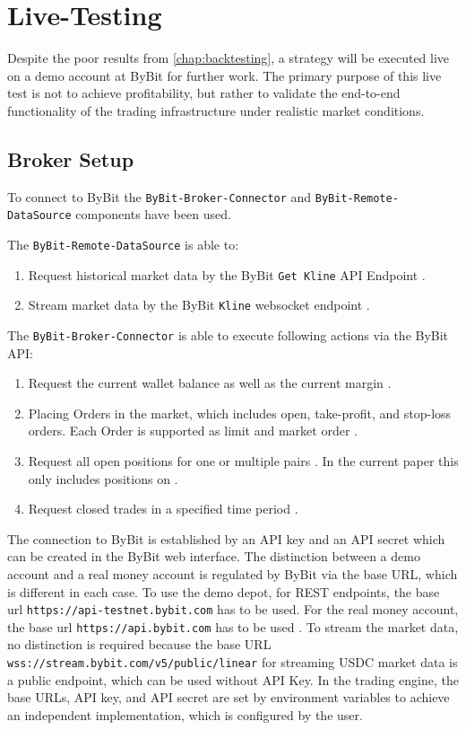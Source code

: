 \section{Live-Testing}
\label{chap:live-test}

Despite the poor results from \autoref{chap:backtesting}, a strategy will be executed live on a demo account at ByBit for further work.
The primary purpose of this live test is not to achieve profitability, but rather to validate the end-to-end functionality of the trading infrastructure under realistic market conditions.


\subsection{Broker Setup}

To connect to ByBit the \verb|ByBit-Broker-Connector| and \verb|ByBit-Remote-DataSource| components have been used.

The \verb|ByBit-Remote-DataSource| is able to:

\begin{enumerate}
    \item Request historical market data by the ByBit \texttt{Get Kline} API Endpoint \cite{get-kline}.
    \item Stream market data by the ByBit \texttt{Kline} websocket endpoint \cite{stream-kline}.
\end{enumerate}

\noindent
The \verb|ByBit-Broker-Connector| is able to execute following actions via the ByBit API:

\begin{enumerate}
    \item Request the current wallet balance as well as the current margin \cite{wallet-balance}.
    \item Placing Orders in the market, which includes open, take-profit, and stop-loss orders. Each Order is supported as limit and market order \cite{place-order}.
    \item Request all open positions for one or multiple pairs \cite{position-info}. In the current paper this only includes positions on \ethusdc.
    \item Request closed trades in a specified time period \cite{closed-pnl}.
\end{enumerate}

\noindent
The connection to ByBit is established by an API key and an API secret which can be created in the ByBit web interface.
The distinction between a demo account and a real money account is regulated by ByBit via the base URL, which is different in each case.
To use the demo depot, for REST endpoints, the base url \texttt{https://api-testnet.bybit.com} has to be used.
For the real money account, the base url \texttt{https://api.bybit.com} has to be used \cite{integration}.
To stream the market data, no distinction is required because the base URL \texttt{wss://stream.bybit.com/v5/public/linear} \cite{ws-connect} for streaming USDC market data is a public endpoint, which can be used without API Key.
In the trading engine, the base URLs, API key, and API secret are set by environment variables to achieve an independent implementation, which is configured by the user.

